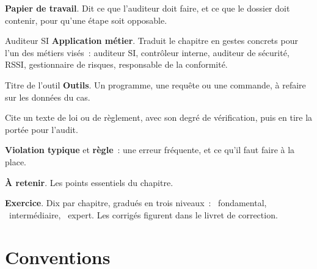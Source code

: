 \begin{boxprocedure}
\textbf{Papier de travail}. Dit ce que l'auditeur doit faire, et ce que le
dossier doit contenir, pour qu'une étape soit opposable.
\end{boxprocedure}

\begin{boxmetier}{Auditeur SI}
\textbf{Application métier}. Traduit le chapitre en gestes concrets pour
l'un des métiers visés~: auditeur SI, contrôleur interne, auditeur de
sécurité, RSSI, gestionnaire de risques, responsable de la conformité.
\end{boxmetier}

\begin{boxoutils}{Titre de l'outil}
\textbf{Outils}. Un programme, une requête ou une commande, à refaire sur
les données du cas.
\end{boxoutils}

\begin{boxjuris}
Cite un texte de loi ou de règlement, avec son degré de vérification, puis
en tire la portée pour l'audit.
\end{boxjuris}

\begin{boxalert}
\textbf{Violation typique} et \textbf{règle}~: une erreur fréquente, et ce
qu'il faut faire à la place.
\end{boxalert}

\begin{boxresume}
\textbf{À retenir}. Les points essentiels du chapitre.
\end{boxresume}

\begin{boxexo}
\textbf{Exercice}. Dix par chapitre, gradués en trois niveaux~:
\niveaubase\ fondamental, \niveaumoyen\ intermédiaire, \niveauexpert\
expert. Les corrigés figurent dans le livret de correction.
\end{boxexo}

\section*{Conventions}

